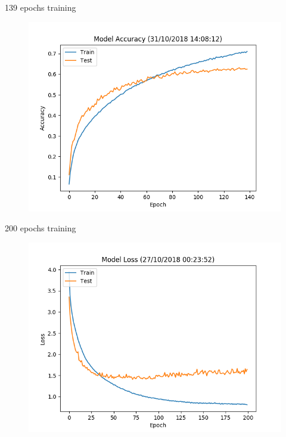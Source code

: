 \documentclass{beamer}
\begin{document}
\begin{frame}[fragile]{139 epochs training}
 \begin{figure}[H]
  \centering
  \includegraphics[scale=0.55]{img/accuracy_139.png}
 \end{figure}
\end{frame}

\begin{frame}[fragile]{200 epochs training}
 \begin{figure}[H]
  \centering
  \includegraphics[scale=0.55]{img/loss.png}
 \end{figure}
\end{frame}
\end{document}

